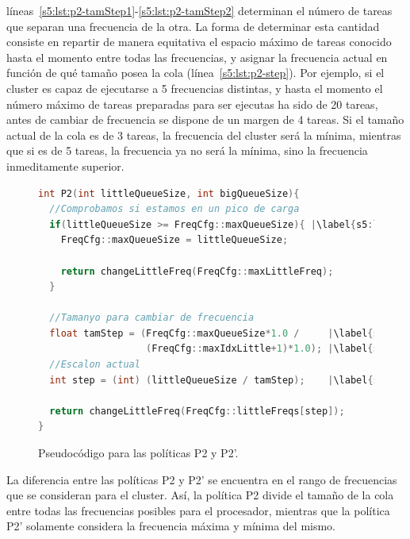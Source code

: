 líneas~\ref{s5:lst:p2-tamStep1}-\ref{s5:lst:p2-tamStep2} determinan el
número de tareas que separan una frecuencia de la otra. La forma de
determinar esta cantidad consiste en repartir de manera equitativa el
espacio máximo de tareas conocido hasta el momento entre todas las
frecuencias, y asignar la frecuencia actual en función de qué tamaño posea
la cola (línea~\ref{s5:lst:p2-step}). Por ejemplo, si el cluster es capaz
de ejecutarse a 5 frecuencias distintas, y hasta el momento el número
máximo de tareas preparadas para ser ejecutas ha sido de 20 tareas, antes
de cambiar de frecuencia se dispone de un margen de 4 tareas. Si el tamaño
actual de la cola es de 3 tareas, la frecuencia del cluster será la mínima,
mientras que si es de 5 tareas, la frecuencia ya no será la mínima, sino la
frecuencia inmeditamente superior.

\begin{figure}
  \centering

  \begin{lstlisting}[language=C++]
int P2(int littleQueueSize, int bigQueueSize){      
  //Comprobamos si estamos en un pico de carga
  if(littleQueueSize >= FreqCfg::maxQueueSize){ |\label{s5:lst:p2-detectPico}|
    FreqCfg::maxQueueSize = littleQueueSize;

    return changeLittleFreq(FreqCfg::maxLittleFreq);
  }

  //Tamanyo para cambiar de frecuencia
  float tamStep = (FreqCfg::maxQueueSize*1.0 /     |\label{s5:lst:p2-tamStep1}|
                   (FreqCfg::maxIdxLittle+1)*1.0); |\label{s5:lst:p2-tamStep2}|
  //Escalon actual
  int step = (int) (littleQueueSize / tamStep);    |\label{s5:lst:p2-step}|

  return changeLittleFreq(FreqCfg::littleFreqs[step]);
}
  \end{lstlisting}

  \caption{Pseudocódigo para las políticas P2 y P2'.}

  \label{s5:fig:listing-p2}
\end{figure}

La diferencia entre las políticas P2 y P2' se encuentra en el rango de
frecuencias que se consideran para el cluster. Así, la política P2 divide
el tamaño de la cola entre todas las frecuencias posibles para el
procesador, mientras que la política P2' solamente considera la frecuencia
máxima y mínima del mismo. 

